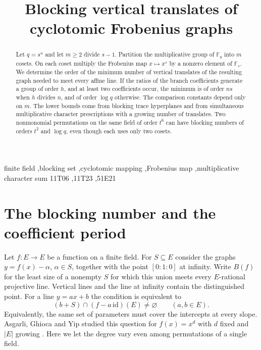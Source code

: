 \documentclass[preprint,12pt,numbers]{elsarticle}
\begin{document}
\begin{frontmatter}
\title{Blocking vertical translates of cyclotomic Frobenius graphs}
\begin{abstract}
Let $q=s^n$ and let $m\ge2$ divide $s-1$. Partition the multiplicative
group of $\mathbb F_q$ into $m$ cosets. On each coset multiply the
Frobenius map $x\mapsto x^s$ by a nonzero element of $\mathbb F_s$.
We determine the order of the minimum number of vertical translates of
the resulting graph needed to meet every affine line. If the ratios of
the branch coefficients generate a group of order $h$, and at least two
coefficients occur, the minimum is of order $ns$ when $h$ divides $n$,
and of order $\log q$ otherwise. The comparison constants depend only
on $m$. The lower bounds come from blocking trace hyperplanes and from
simultaneous multiplicative character prescriptions with a growing
number of translates. Two nonmonomial permutations on the same field
of order $t^6$ can have blocking numbers of orders $t^2$ and $\log q$,
even though each uses only two cosets.
\end{abstract}
\begin{keyword}
finite field \sep blocking set \sep cyclotomic mapping \sep Frobenius map \sep multiplicative character sum
\MSC[2020] 11T06 \sep 11T23 \sep 51E21
\end{keyword}
\end{frontmatter}

\section{The blocking number and the coefficient period}
Let $f:E\to E$ be a function on a finite field. For $S\subseteq E$ consider
the graphs $y=f(x)-\alpha$, $\alpha\in S$, together with the point
$[0:1:0]$ at infinity. Write $B(f)$ for the least size of a nonempty
$S$ for which this union meets every $E$-rational projective line.
Vertical lines and the line at infinity contain the distinguished point.
For a line $y=ax+b$ the condition is equivalent to
\begin{equation}\label{eq:block}
   (b+S)\cap (f-a\,\mathrm{id})(E)\ne\varnothing
   \qquad(a,b\in E).
\end{equation}
Equivalently, the same set of parameters must cover the intercepts
at every slope. Asgarli, Ghioca and Yip studied this question for
$f(x)=x^d$ with $d$ fixed and $|E|$ growing \cite[Section~5]{AGY}.
Here we let the degree vary even among permutations of a single field.
\end{document}

